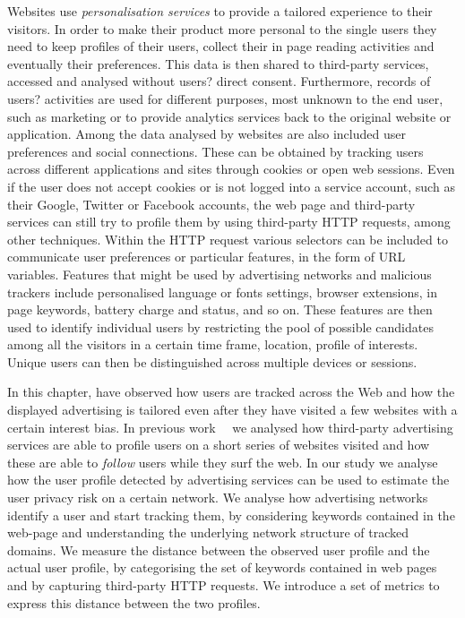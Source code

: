 Websites use \emph{personalisation services} to provide a tailored experience to their visitors. In order to make their product more personal to the single users they need to keep profiles of their users, collect their in page reading activities and eventually their preferences. This data is then shared to third-party services, accessed and analysed without users? direct consent. Furthermore, records of users? activities are used for different purposes, most unknown to the end user, such as marketing or to provide analytics services back to the original website or application.
Among the data analysed by websites are also included user preferences and social connections. These can be obtained by tracking users across different applications and sites through cookies or open web sessions. Even if the user does not accept cookies or is not logged into a service account, such as their Google, Twitter or Facebook accounts, the web page and third-party services can still try to profile them by using third-party HTTP requests, among other techniques. Within the HTTP request various selectors can be included to communicate user preferences or particular features, in the form of URL variables. Features that might be used by advertising networks and malicious trackers include personalised language or fonts settings, browser extensions, in page keywords, battery charge and status, and so on. These features are then used to identify individual users by restricting the pool of possible candidates among all the visitors in a certain time frame, location, profile of interests. Unique users can then be distinguished across multiple devices or sessions.

In this chapter, have observed how users are tracked across the Web and how the displayed advertising is tailored even after they have visited a few websites with a certain interest bias. In previous work~\cite{puglisi2016web}~\cite{puglisi2015you} we analysed how third-party advertising services are able to profile users on a short series of websites visited and how these are able to \emph{follow} users while they surf the web.
In our study we analyse how the user profile detected by advertising services can be used to estimate the user privacy risk on a certain network. We analyse how advertising networks identify a user and start tracking them, by considering keywords contained in the web-page and understanding the underlying network structure of tracked domains. We measure the distance between the observed user profile and the actual user profile, by categorising the set of keywords contained in web pages and by capturing third-party HTTP requests. We introduce a set of metrics to express this distance between the two profiles.

